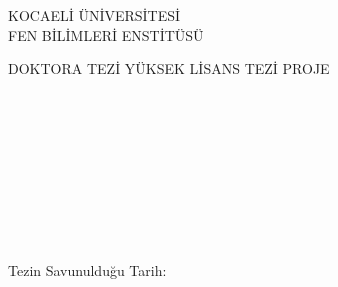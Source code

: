 \begin{approvalpage}
	\begin{minipage}[t][2.53cm][t]{\textwidth}
		\centering
		KOCAELİ ÜNİVERSİTESİ \\ FEN BİLİMLERİ ENSTİTÜSÜ 
	\end{minipage} 	
	\begin{minipage}[t][2.51cm][t]{\textwidth}
		\centering
		\MakeUppercase{\Dept}	
	\end{minipage} 	
	\begin{minipage}[t][2.52cm][t]{\textwidth}
		\centering
		\ifphd
		\MakeUppercase{DOKTORA TEZİ}
		\fi
		\ifmsc
		\MakeUppercase{YÜKSEK LİSANS TEZİ}
		\else
		\MakeUppercase{PROJE}
		\fi
	\end{minipage} 	
	\begin{minipage}[t][4.22cm][t]{\textwidth}
		\centering
		\MakeUppercase{\Title}
	\end{minipage} 	
	\begin{minipage}[t][4.20cm][t]{\textwidth}
		\centering
		\MakeUppercase{\Author}
	\end{minipage} 
	\begin{minipage}[t][6.64cm][t]{0.746\textwidth}
		\fontsize{12}{0}\selectfont
		\setlength{\parskip}{5.8pt}
		\jr \\
		\jrd \hspace*{\fill}  
		
		\jrS \\
		\jrdS \hspace*{\fill}  
		
		\jrT \\
		\jrdT \hspace*{\fill}  
		
		\jrF \\
		\jrdF \hspace*{\fill}  
		
		\jrFT \\
		\jrdFT \hspace*{\fill}  
	\end{minipage} 	
	\begin{minipage}[t][1.0cm][t]{\textwidth}
		\centering
		Tezin Savunulduğu Tarih: \MakeUppercase{\PDate}
	\end{minipage} 
\end{approvalpage}
\clearpage




